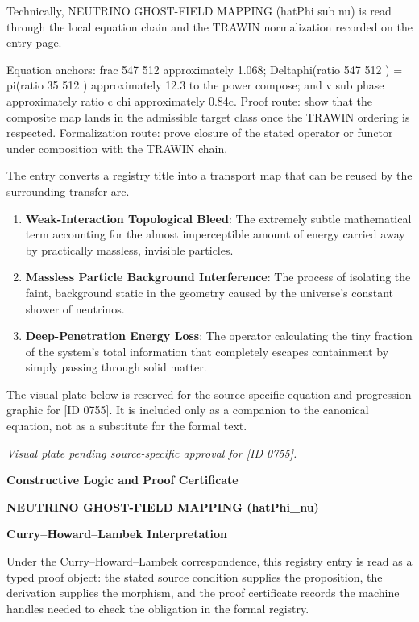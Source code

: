 Technically, NEUTRINO GHOST-FIELD MAPPING (hatPhi sub nu) is read through the local equation chain and the TRAWIN normalization recorded on the entry page.

Equation anchors: frac 547 512 approximately 1.068; Deltaphi(ratio 547 512 ) = pi(ratio 35 512 ) approximately 12.3 to the power compose; and v sub phase approximately ratio c chi approximately 0.84c. Proof route: show that the composite map lands in the admissible target class once the TRAWIN ordering is respected. Formalization route: prove closure of the stated operator or functor under composition with the TRAWIN chain.

The entry converts a registry title into a transport map that can be reused by the surrounding transfer arc.
\endgroup

\begin{enumerate}[leftmargin=1.6em,itemsep=6pt,topsep=4pt]
\item \textbf{Weak-Interaction Topological Bleed}: The extremely subtle mathematical term accounting for the almost imperceptible amount of energy carried away by practically massless, invisible particles.
\item \textbf{Massless Particle Background Interference}: The process of isolating the faint, background static in the geometry caused by the universe's constant shower of neutrinos.
\item \textbf{Deep-Penetration Energy Loss}: The operator calculating the tiny fraction of the system's total information that completely escapes containment by simply passing through solid matter.
\end{enumerate}

\begingroup\footnotesize\sloppy
The visual plate below is reserved for the source-specific equation and progression graphic for [ID 0755]. It is included only as a companion to the canonical equation, not as a substitute for the formal text.
\par\endgroup
\begingroup\footnotesize\itshape
Visual plate pending source-specific approval for [ID 0755].
\par\endgroup

\clearpage
\begingroup\tzpsupportsetup
\noindent\textbf{\fontsize{10.8pt}{12.8pt}\selectfont [ID 0755] Constructive Logic and Proof Certificate}\par
\noindent\textbf{\fontsize{10pt}{12pt}\selectfont NEUTRINO GHOST-FIELD MAPPING (hatPhi\_nu)}\par
\vspace{0.45em}
\begingroup
\footnotesize
\setlength{\parskip}{0.22em}
\setlength{\parindent}{0pt}
\noindent\textbf{Curry--Howard--Lambek Interpretation}\par
Under the Curry--Howard--Lambek correspondence, this registry entry is read as a typed proof
object: the stated source condition supplies the proposition, the derivation supplies the
morphism, and the proof certificate records the machine handles needed to check the obligation
in the formal registry.


